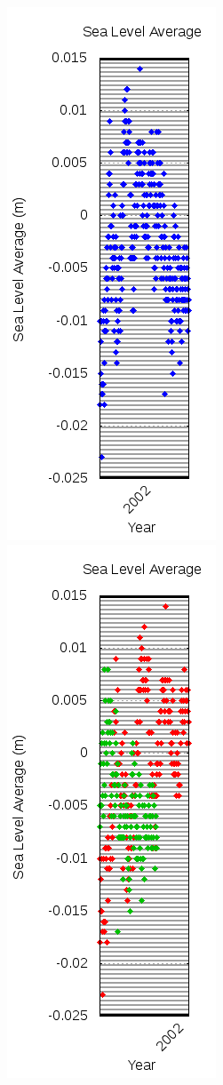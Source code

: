 \documentclass{article}
\begin{document}
\begin{figure}
\includegraphics{files/blog/2018_06_02_measuring_sea_level_averages_using_rads/2018_06_02_datasets_before.png}
\includegraphics{files/blog/2018_06_02_measuring_sea_level_averages_using_rads/2018_06_02_datasets_midway.png}

\end{figure}
\end{document}
